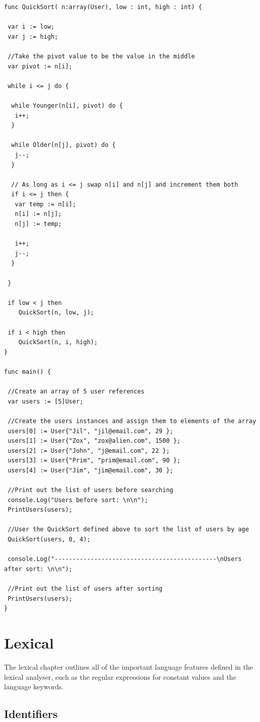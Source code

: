 \documentclass[]{final_report}
\begin{document}
\begin{verbatim}
func QuickSort( n:array(User), low : int, high : int) {

 var i := low;
 var j := high;

 //Take the pivot value to be the value in the middle
 var pivot := n[i];

 while i <= j do {

  while Younger(n[i], pivot) do {
   i++;
  }
  
  while Older(n[j], pivot) do {
   j--;
  }

  // As long as i <= j swap n[i] and n[j] and increment them both
  if i <= j then {
   var temp := n[i];
   n[i] := n[j];
   n[j] := temp;
   
   i++;
   j--;
  }

 }
 
 if low < j then 
 	QuickSort(n, low, j);
 
 if i < high then 
 	QuickSort(n, i, high);
}

func main() {

 //Create an array of 5 user references
 var users := [5]User;
 
 //Create the users instances and assign them to elements of the array
 users[0] := User{"Jil", "jil@email.com", 29 };
 users[1] := User{"Zox", "zox@alien.com", 1500 };
 users[2] := User{"John", "j@email.com", 22 };
 users[3] := User{"Prim", "prim@email.com", 90 };
 users[4] := User{"Jim", "jim@email.com", 30 };
 
 //Print out the list of users before searching
 console.Log("Users before sort: \n\n");
 PrintUsers(users);

 //User the QuickSort defined above to sort the list of users by age
 QuickSort(users, 0, 4);
 
 console.Log("---------------------------------------------\nUsers after sort: \n\n");
 
 //Print out the list of users after sorting
 PrintUsers(users);
}
\end{verbatim}

\section{Lexical}

The lexical chapter outlines all of the important language features defined in the lexical analyser, such as the regular expressions for constant values and the language keywords.

\subsection{Identifiers}
\end{document}
